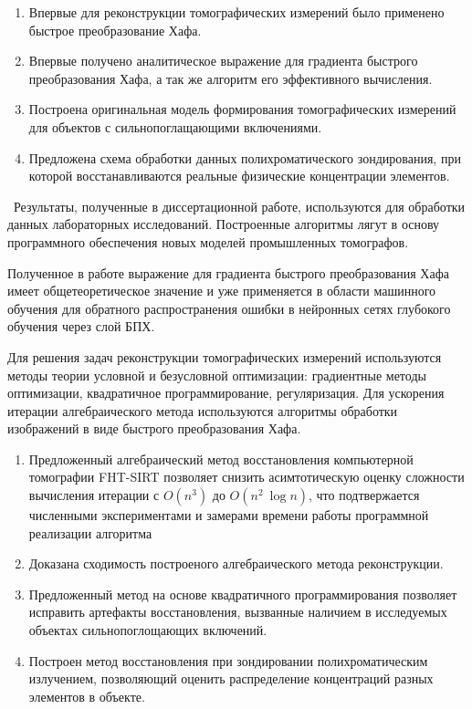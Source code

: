 {\novelty}
\begin{enumerate}
  \item Впервые для реконструкции томографических измерений было применено быстрое преобразование Хафа.
  \item Впервые получено аналитическое выражение для градиента быстрого преобразования Хафа, а так же алгоритм его эффективного вычисления.
  \item Построена оригинальная модель формирования томографических измерений для объектов с сильнопоглащающими включениями.
  \item Предложена схема обработки данных полихроматического зондирования, при которой восстанавливаются реальные физические концентрации элементов.
\end{enumerate}
{\influence} ~Результаты, полученные в диссертационной работе, используются для обработки данных лабораторных исследований. Построенные алгоритмы лягут в основу программного обеспечения новых моделей промышленных томографов.

Полученное в работе выражение для градиента быстрого преобразования Хафа имеет общетеоретическое значение и уже применяется в области машинного обучения для обратного распространения ошибки в нейронных сетях глубокого обучения через слой БПХ.

{\methods}
Для решения задач реконструкции томографических измерений используются методы теории условной и безусловной оптимизации: градиентные методы оптимизации, квадратичное программирование, регуляризация.
Для ускорения итерации алгебраического метода используются алгоритмы обработки изображений в виде быстрого преобразования Хафа.


{}
\begin{enumerate}
  \item Предложенный алгебраический метод восстановления компьютерной томографии FHT-SIRT позволяет снизить асимтотическую оценку сложности вычисления итерации с $O(n^3)$ до $O(n^2~\log n)$, что подтвержается численными экспериментами и замерами времени работы программной реализации алгоритма
  \item Доказана сходимость построеного алгебраического метода реконструкции. 
  \item Предложенный метод на основе квадратичного программирования позволяет исправить артефакты восстановления, вызванные наличием в исследуемых объектах сильнопоглощающих включений.
  \item Построен метод восстановления при зондировании полихроматическим излучением, позволяющий оценить распределение концентраций разных элементов в объекте.
\end{enumerate}


